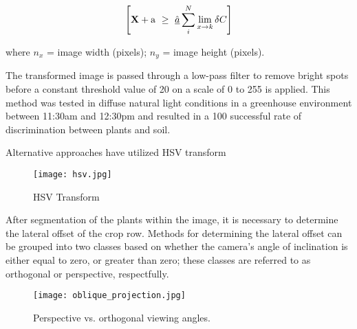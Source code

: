 \begin{equation}
  \left[
    {\bf X} + {\rm a} \ \geq\ 
    \underline{\hat a} \sum_i^N \lim_{x \rightarrow k} \delta C
  \right]
\end{equation}
\begin{flushleft}
where $n_{x}$ = image width (pixels); $n_{y}$ = image height (pixels).
\end{flushleft}

The transformed image is passed through a low-pass filter to remove
bright spots before a constant threshold value of 20 on a scale of 0
to 255 is applied. This method was tested in diffuse natural light
conditions in a greenhouse environment between 11:30am and 12:30pm and
resulted in a 100 successful rate of discrimination between plants and
soil.

Alternative approaches have utilized HSV transform

\begin{figure}
  \centering
  \texttt{[image: hsv.jpg]}
  \caption{HSV Transform}
\end{figure}

After segmentation of the plants within the image, it is necessary to
determine the lateral offset of the crop row. Methods for determining
the lateral offset can be grouped into two classes based on whether
the camera’s angle of inclination is either equal to zero, or greater
than zero; these classes are referred to as orthogonal or perspective,
respectfully. 

\begin{figure}
  \centering
  \texttt{[image: oblique\_projection.jpg]}
  \caption{Perspective vs. orthogonal viewing angles.}
  \label{fig:projection}
\end{figure}

